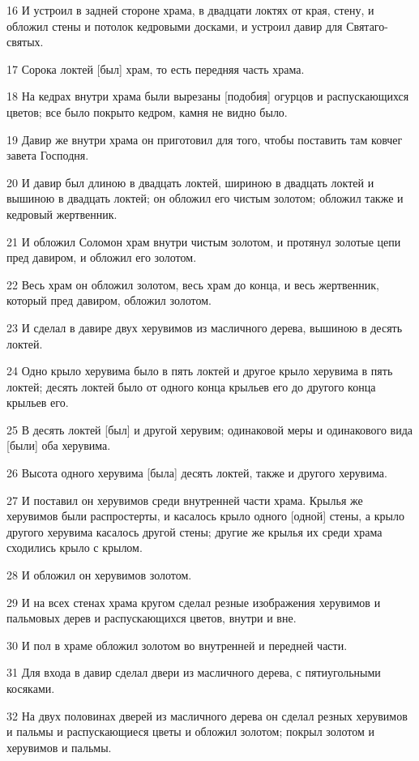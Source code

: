 \par 16 И устроил в задней стороне храма, в двадцати локтях от края, стену, и обложил стены и потолок кедровыми досками, и устроил давир для Святаго-святых.
\par 17 Сорока локтей [был] храм, то есть передняя часть храма.
\par 18 На кедрах внутри храма были вырезаны [подобия] огурцов и распускающихся цветов; все было покрыто кедром, камня не видно было.
\par 19 Давир же внутри храма он приготовил для того, чтобы поставить там ковчег завета Господня.
\par 20 И давир был длиною в двадцать локтей, шириною в двадцать локтей и вышиною в двадцать локтей; он обложил его чистым золотом; обложил также и кедровый жертвенник.
\par 21 И обложил Соломон храм внутри чистым золотом, и протянул золотые цепи пред давиром, и обложил его золотом.
\par 22 Весь храм он обложил золотом, весь храм до конца, и весь жертвенник, который пред давиром, обложил золотом.
\par 23 И сделал в давире двух херувимов из масличного дерева, вышиною в десять локтей.
\par 24 Одно крыло херувима было в пять локтей и другое крыло херувима в пять локтей; десять локтей было от одного конца крыльев его до другого конца крыльев его.
\par 25 В десять локтей [был] и другой херувим; одинаковой меры и одинакового вида [были] оба херувима.
\par 26 Высота одного херувима [была] десять локтей, также и другого херувима.
\par 27 И поставил он херувимов среди внутренней части храма. Крылья же херувимов были распростерты, и касалось крыло одного [одной] стены, а крыло другого херувима касалось другой стены; другие же крылья их среди храма сходились крыло с крылом.
\par 28 И обложил он херувимов золотом.
\par 29 И на всех стенах храма кругом сделал резные изображения херувимов и пальмовых дерев и распускающихся цветов, внутри и вне.
\par 30 И пол в храме обложил золотом во внутренней и передней части.
\par 31 Для входа в давир сделал двери из масличного дерева, с пятиугольными косяками.
\par 32 На двух половинах дверей из масличного дерева он сделал резных херувимов и пальмы и распускающиеся цветы и обложил золотом; покрыл золотом и херувимов и пальмы.
